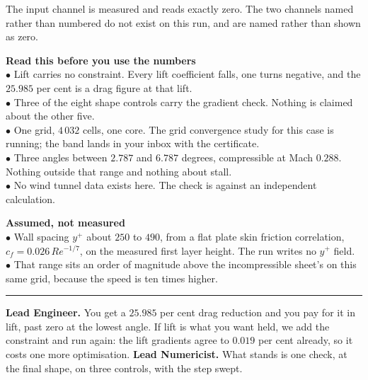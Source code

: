 \documentclass[9pt,a4paper]{article}
\renewcommand{\footnotesize}{\fontsize{6.4}{6.85}\selectfont}
\renewcommand{\scriptsize}{\fontsize{5.7}{6.1}\selectfont}
\newcommand{\rolesig}[1]{\textbf{\footnotesize#1}}
\begin{document}
\begin{minipage}[t]{0.335\textwidth}
\vspace{1pt}
{\scriptsize The input channel is measured and reads exactly zero. The two
channels named rather than numbered do not exist on this run, and are named
rather than shown as zero.}
\end{minipage}\hfill
\begin{minipage}[t]{0.325\textwidth}
\colorbox{boxgrey}{\begin{minipage}[t]{0.955\textwidth}
{\footnotesize\textbf{Read this before you use the numbers}\\[1pt]
$\bullet$ Lift carries no constraint. Every lift coefficient falls, one turns
negative, and the $25.985$ per cent is a drag figure at that lift.\\
$\bullet$ Three of the eight shape controls carry the gradient check. Nothing
is claimed about the other five.\\
$\bullet$ One grid, $4\,032$ cells, one core. The grid convergence study for
this case is running; the band lands in your inbox with the certificate.\\
$\bullet$ Three angles between $2.787$ and $6.787$ degrees, compressible at
Mach $0.288$. Nothing outside that range and nothing about stall.\\
$\bullet$ No wind tunnel data exists here. The check is against an independent
calculation.}
\end{minipage}}
\end{minipage}\hfill
\begin{minipage}[t]{0.305\textwidth}
\colorbox{boxgrey}{\begin{minipage}[t]{0.955\textwidth}
{\footnotesize\textbf{Assumed, not measured}\\[1pt]
$\bullet$ Wall spacing $y^{+}$ about $250$ to $490$, from a flat plate skin
friction correlation, $c_f = 0.026\,Re^{-1/7}$, on the measured first layer
height. The run writes no $y^{+}$ field.\\
$\bullet$ That range sits an order of magnitude above the incompressible
sheet's on this same grid, because the speed is ten times higher.}
\end{minipage}}
\end{minipage}

\vspace{2pt}
{\color{rulegrey}\rule{\textwidth}{0.5pt}}

\vspace{1pt}
{\footnotesize
\rolesig{Lead Engineer.} You get a $25.985$ per cent drag reduction and you pay
for it in lift, past zero at the lowest angle. If lift is what you want held,
we add the constraint and run again: the lift gradients agree to $0.019$ per
cent already, so it costs one more optimisation.
\rolesig{Lead Numericist.} What stands is one check, at the final shape, on
three controls, with the step swept.}
\end{document}
